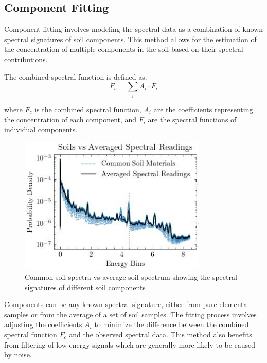 \documentclass[review]{elsarticle}
\begin{document}
\subsection{Component Fitting}

Component fitting involves modeling the spectral data as a combination of known spectral signatures of soil components. This method allows for the estimation of the concentration of multiple components in the soil based on their spectral contributions.

The combined spectral function is defined as:
\begin{equation}
F_c = \sum_{i} A_i \cdot F_i
\end{equation}

where $F_c$ is the combined spectral function, $A_i$ are the coefficients representing the concentration of each component, and $F_i$ are the spectral functions of individual components.

\begin{figure}[H]
\centering
\includegraphics[width=0.8\textwidth]{../Figures/DataGeneration/CommonSoilSpectravsAverageSoilSpectrum.jpg}
\caption{Common soil spectra vs average soil spectrum showing the spectral signatures of different soil components}
\label{fig:common_soil_spectra}
\end{figure}

Components can be any known spectral signature, either from pure elemental samples \cite{kavetskiy_neutron_2023} or from the average of a set of soil samples. The fitting process involves adjusting the coefficients $A_i$ to minimize the difference between the combined spectral function $F_c$ and the observed spectral data. This method also benefits from filtering of low energy signals which are generally more likely to be caused by noise.
\end{document}
